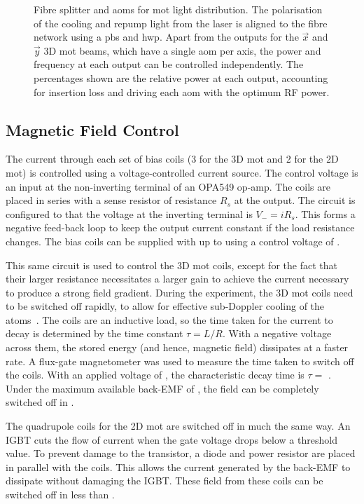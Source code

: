 \begin{figure}[!htbp] 
  \centering 
  \fontsize{18pt}{18pt}
  \resizebox{0.5\textwidth}{!}{}
  \caption[Network of optical fibre splitters and \acp{aom} for
  \ac{mot}light distribution]{Fibre splitter and \acp{aom} for
  \ac{mot} light distribution. The polarisation of the cooling and
repump light from the \Muquans laser is aligned to the fibre network
using a \ac{pbs} and \ac{hwp}. Apart from the outputs for the
\(\vec{x}\) and \(\vec{y}\) 3D \ac{mot} beams, which have a single
\ac{aom} per axis, the power and frequency at each output can be
controlled independently. The percentages shown are the relative power
at each output, accounting for insertion loss and driving each
\ac{aom} with the optimum RF power.} 
\label{fig:fibre_network}
\end{figure} 
\subsection{Magnetic Field Control}\label{subsec:coil_control} 
The current through each set of
bias coils (3 for the 3D \ac{mot} and 2 for the 2D \ac{mot}) is
controlled using a voltage-controlled current source. The control
voltage is an input at the non-inverting terminal of an OPA549 op-amp.
The coils are placed in series with a sense resistor of resistance
\(R_s\) at the output. The circuit is configured to that the voltage
at the inverting terminal is \(V_- = i R_s\).  This forms a negative
feed-back loop to keep the output current constant if the load
resistance changes. The bias coils can be supplied with up to
 using a control voltage of .
\par\noindent This same circuit is used to control the 3D \ac{mot}
coils, except for the fact that their larger resistance necessitates a
larger gain to achieve the current necessary to produce a strong field
gradient. During the experiment, the 3D \ac{mot} coils need to be
switched off rapidly, to allow for effective sub-Doppler cooling of
the atoms~\cite{Dedman2001}. The coils are an inductive load, so the time taken for the
current to decay is determined by the time constant \(\tau = L/R\).
With a negative voltage across them, the stored energy (and hence,
magnetic field) dissipates at a faster rate. A flux-gate magnetometer
was used to measure the time taken to switch off the coils. With an
applied voltage of , the characteristic decay time
is \(\tau = \) . Under the maximum
available back-EMF of , the field can be
completely switched off in . \par\noindent
The quadrupole coils for the 2D \ac{mot} are switched off in much the
same way. An IGBT cuts the flow of current when the gate voltage drops
below a threshold value. To prevent damage to the transistor, a diode
and  power resistor are placed in parallel with the
coils. This allows the current generated by the back-EMF to dissipate
without damaging the IGBT. These field from these coils can be
switched off in less than .

